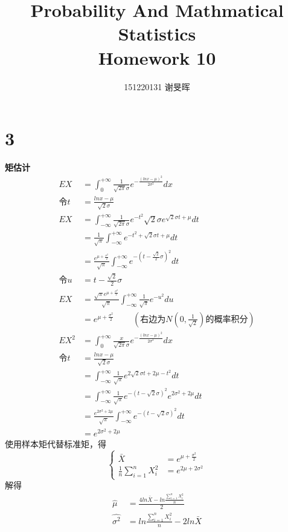 \documentclass[a4paper,twocolumn]{ctexart}
\title{Probability And Mathmatical Statistics\\Homework 10}
\author{151220131 谢旻晖}
\date{}
\begin{document}
\maketitle
\section*{3}
\noindent\textbf{矩估计}\\
\begin{align*}
EX&=\int_{0}^{+\infty}\frac{1}{\sqrt{2\pi}\sigma}e^{-\frac{(lnx-\mu)^2}{2\sigma^2}}dx\\
\text{令}t&=\frac{lnx-\mu}{\sqrt{2}\sigma}\\
EX&=\int_{-\infty}^{+\infty}\frac{1}{\sqrt{2\pi}\sigma}e^{-t^2}\sqrt{2}\sigma e^{\sqrt{2}\sigma t+\mu}dt\\
&=\frac{1}{\sqrt{\pi}}\int_{-\infty}^{+\infty}e^{-t^2+\sqrt{2}\sigma t+\mu}dt\\
&=\frac{e^{\mu+\frac{\sigma^2}{2}}}{\sqrt{\pi}}\int_{-\infty}^{+\infty}e^{-(t-\frac{\sqrt{2}}{2}\sigma)^2}dt\\
\text{令}u&=t-\frac{\sqrt{2}}{2}\sigma\\
EX&=\frac{\sqrt{\pi}e^{\mu+\frac{\sigma^2}{2}}}{\sqrt{\pi}}\int_{-\infty}^{+\infty}\frac{1}{\sqrt{\pi}}e^{-u^2}du\\
&=e^{\mu+\frac{\sigma^2}{2}}~~~~~~~~~~(\text{右边为}N(0,\frac{1}{\sqrt{2}})\text{的概率积分})\\
EX^2&=\int_{0}^{+\infty}\frac{x}{\sqrt{2\pi}\sigma}e^{-\frac{(lnx-\mu)^2}{2\sigma^2}}dx\\
\text{令}t&=\frac{lnx-\mu}{\sqrt{2}\sigma}\\
&=\int_{-\infty}^{+\infty}\frac{1}{\sqrt{\pi}}e^{2\sqrt{2}\sigma t+2\mu -t^2}dt\\
&=\int_{-\infty}^{+\infty}\frac{1}{\sqrt{\pi}}e^{-(t-\sqrt{2}\sigma)^2}e^{2\sigma^2+2\mu}dt\\
&=\frac{e^{2\sigma^2+2\mu}}{\sqrt{\pi}}\int_{-\infty}^{+\infty}e^{-(t-\sqrt{2}\sigma)^2}dt\\
&=e^{2\sigma^2+2\mu}
\end{align*}
使用样本矩代替标准矩，得
\[
\begin{cases}
	\bar{X}&=e^{\mu+\frac{\sigma^2}{2}}\\
	\frac{1}{n}\sum_{i=1}^{n} X_i^2&=e^{2\mu+2\sigma^2}
\end{cases}
\]
解得
\begin{align*}
\hat{\mu}&=\frac{4ln\bar{X}-ln\frac{\sum_{i=1}^{n}X_i^2}{n}}{2}\\
\hat{\sigma^2}&=ln\frac{\sum_{i=1}^{n}X_i^2}{n}-2ln\bar{X}
\end{align*}
\end{document}
